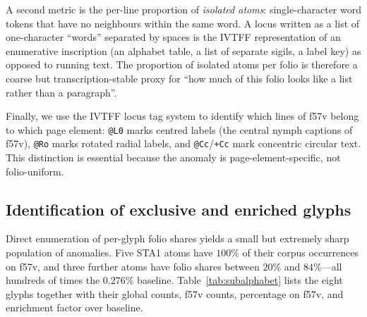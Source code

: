 A second metric is the per-line proportion of \emph{isolated atoms}:
single-character word tokens that have no neighbours within the same word.
A locus written as a list of one-character ``words'' separated by spaces is
the IVTFF representation of an enumerative inscription (an alphabet table, a
list of separate sigils, a label key) as opposed to running text. The
proportion of isolated atoms per folio is therefore a coarse but transcription-stable
proxy for ``how much of this folio looks like a list rather than a paragraph''.

Finally, we use the IVTFF locus tag system \citep{zandbergen_ivtff} to identify
which lines of f57v belong to which page element: \texttt{@L0} marks centred
labels (the central nymph captions of f57v), \texttt{@Ro} marks rotated radial
labels, and \texttt{@Cc}/\texttt{+Cc} mark concentric circular text. This
distinction is essential because the anomaly is page-element-specific, not
folio-uniform.

\subsection{Identification of exclusive and enriched glyphs}
\label{sec:identification}

Direct enumeration of per-glyph folio shares yields a small but extremely
sharp population of anomalies. Five STA1 atoms have $100\%$ of their corpus
occurrences on f57v, and three further atoms have folio shares between
$20\%$ and $84\%$---all hundreds of times the $0.276\%$ baseline.
Table~\ref{tab:subalphabet} lists the eight glyphs together with their global
counts, f57v counts, percentage on f57v, and enrichment factor over baseline.

